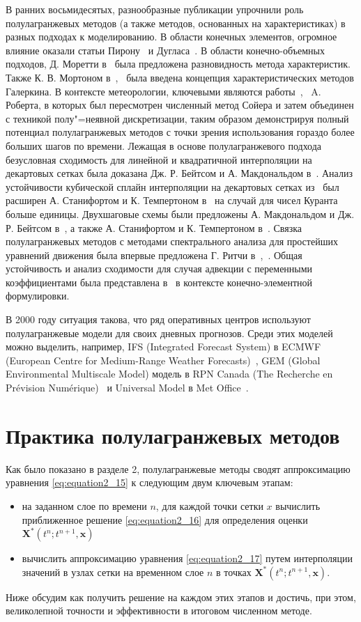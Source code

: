 В ранних восьмидесятых, разнообразные публикации упрочнили роль полулагранжевых методов (а также методов, основанных на характеристиках) в разных подходах к моделированию. В области конечных элементов, огромное влияние оказали статьи Пирону~\cite{A50} и Дугласа~\cite{A27}. В области конечно-объемных подходов, Д. Моретти в~\cite{A41} была предложена разновидность метода характеристик. Также К. В. Мортоном в~\cite{A42},~\cite{A45} была введена концепция характеристических методов Галеркина. В контексте метеорологии, ключевыми являются работы~\cite{A59},~\cite{A60} A. Роберта, в которых был пересмотрен численный метод Сойера и затем объединен с техникой полу"=неявной дискретизации, таким образом демонстрируя полный потенциал полулагранжевых методов с точки зрения использования гораздо более больших шагов по времени. Лежащая в основе полулагранжевого подхода безусловная сходимость для линейной и квадратичной интерполяции на декартовых сетках была доказана Дж. Р. Бейтсом и А. Макдональдом в~\cite{A3}. Анализ устойчивости кубической сплайн интерполяции на декартовых сетках из~\cite{A53} был расширен А. Станифортом и К. Темпертоном в~\cite{A52} на случай для чисел Куранта больше единицы. Двухшаговые схемы были предложены А. Макдональдом и Дж. Р. Бейтсом в~\cite{A38}, а также А. Станифортом и К. Темпертоном в~\cite{A70}. Связка полулагранжевых методов с методами спектрального анализа для простейших уравнений движения была впервые предложена Г. Ритчи в~\cite{A57},~\cite{A58}. Общая устойчивость и анализ сходимости для случая адвекции с переменными коэффициентами была представлена в~\cite{A16} в контексте конечно-элементной формулировки.

В 2000 году ситуация такова, что ряд оперативных центров используют полулагранжевые модели для своих дневных прогнозов. Среди этих моделей можно выделить, например, IFS (Integrated Forecast System) в ECMWF (European Centre for Medium-Range Weather Forecasts)~\cite{A71}, GEM (Global Environmental Multiscale Model) модель в RPN Canada (The Recherche en Prévision Numérique)~\cite{A9} и Universal Model в Met Office~\cite{A72}.
\chapter{Практика полулагранжевых методов} \label{chapt_5}
Как было показано в разделе 2, полулагранжевые методы сводят аппроксимацию уравнения \eqref{eq:equation2_15} к следующим двум ключевым этапам:
\begin{itemize}
	\item на заданном слое по времени $n$, для каждой точки сетки $x$ вычислить приближенное решение \eqref{eq:equation2_16} для определения оценки $\mathbf{X}^*(t^n;t^{n+1}, \mathbf{x})$
	\item вычислить аппроксимацию уравнения \eqref{eq:equation2_17} путем интерполяции значений в узлах сетки на временном слое $n$ в точках $\mathbf{X}^*(t^n;t^{n+1}, \mathbf{x})$.
\end{itemize}
Ниже обсудим как получить решение на каждом этих этапов и достичь, при этом, великолепной точности и эффективности в итоговом численном методе.
